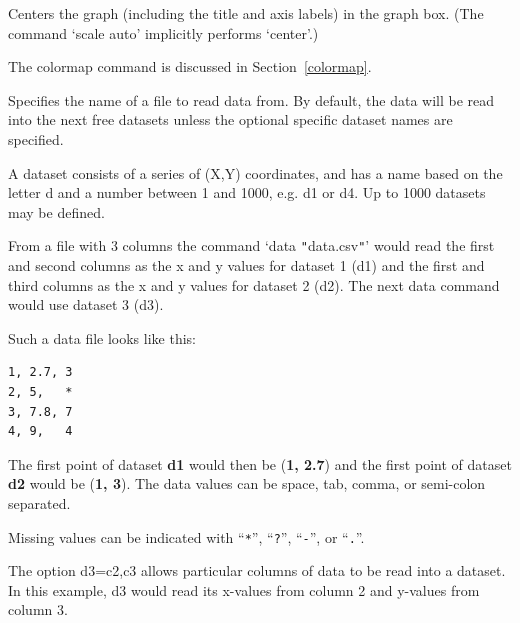 \begin{commanddescription}
\item[{\sf center}]
Centers the graph (including the title and axis labels) in the graph box. (The command `{\sf scale auto}' implicitly performs `{\sf center}'.)

\item [{\sf colormap {\it fct} {\it pixels-x} {\it pixels-y} [{\it color}] [{\it invert}] [{\it zmin} $z_1$]  [{\it zmax} $z_2$] [{\it palette} {\it pal}]}]

The colormap command is discussed in Section~\ref{colormap}.

\item[{\sf data {\it filename {\sf [}d1 d2 d3 ...{\sf ] [}d1=c1,c3 ...{\sf ]}} [ignore {\it n}] [comment {\it char}] [numrows {\it n}] }]
\label{cmd:data}
Specifies the name of a file to read data from.  By default,
the data will be read into the next free datasets unless the
optional specific dataset names are specified.

A dataset consists of a series of (X,Y) coordinates, and has a
name based on the letter {\sf d} and a number between 1 and 1000,
e.g. {\sf d1} or {\sf d4}. Up to 1000 datasets may be defined.

From a file with 3 columns the command
`{\sf data \verb+"+data.csv\verb+"+}' would read the first and second columns as the x and y values for dataset 1 (d1) and the first and third columns as the x and y values for dataset 2 (d2). The next {\sf data} command would use dataset 3 (d3).

Such a data file looks like this:

\begin{Verbatim}
1, 2.7, 3
2, 5,   *
3, 7.8, 7
4, 9,   4
\end{Verbatim}

The first point of dataset {\bf d1} would then be ({\bf 1, 2.7}) and the first point of dataset {\bf d2} would be ({\bf 1, 3}). The data values can be space, tab, comma, or semi-colon separated.

Missing values can be indicated with ``\verb+*+'', ``\verb+?+'', ``\verb+-+'', or ``\verb+.+''.

The option {\sf d3=c2,c3} allows particular columns of data to be read into a dataset. In this example, d3 would read its x-values from column 2 and y-values from column 3.


\end{commanddescription}

